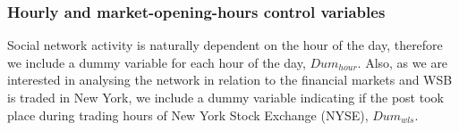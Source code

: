 \subsubsection*{Hourly and market-opening-hours control variables}
Social network activity is naturally dependent on the hour of the day, therefore we include a dummy variable for each hour of the day, $Dum_{hour}$. %
Also, as we are interested in analysing the network in relation to the financial markets and WSB is traded in New York, we include a dummy variable indicating if the post took place during trading hours of New York Stock Exchange (NYSE), $Dum_{wls}$. 



